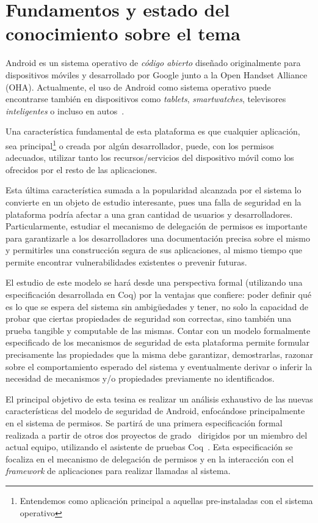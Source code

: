 \section{Fundamentos y estado del conocimiento sobre el tema}

Android es un sistema operativo de \textit{código abierto} diseñado
originalmente para dispositivos móviles y desarrollado por Google junto a la
Open Handset Alliance (OHA). Actualmente, el uso de Android como sistema
operativo puede encontrarse también en dispositivos como \textit{tablets},
\textit{smartwatches}, televisores \textit{inteligentes} o incluso en autos~\cite{android-car}.

Una característica fundamental de esta plataforma es que cualquier aplicación,
sea principal\footnote{Entendemos como aplicación principal a aquellas
    pre-instaladas con el sistema operativo} o creada por algún desarrollador,
puede, con los permisos adecuados, utilizar tanto los recursos/servicios del
dispositivo móvil como los ofrecidos por el resto de las aplicaciones.

Esta última característica sumada a la popularidad alcanzada por el sistema lo
convierte en un objeto de estudio interesante, pues una falla de seguridad en la
plataforma podría afectar a una gran cantidad de usuarios y desarrolladores.
Particularmente, estudiar el mecanismo de delegación de permisos es importante
para garantizarle a los desarrolladores una documentación precisa sobre el mismo
y permitirles una construcción segura de sus aplicaciones, al mismo tiempo que
permite encontrar vulnerabilidades existentes o prevenir futuras.

El estudio de este modelo se hará desde una perspectiva formal (utilizando una
especificación desarrollada en Coq) por la ventajas que confiere: poder definir
qué es lo que se espera del sistema sin ambigüedades y tener, no solo la
capacidad de probar que ciertas propiedades de seguridad son correctas, sino
también una prueba tangible y computable de las mismas. Contar con un modelo
formalmente especificado de los mecanismos de seguridad de esta plataforma
permite formular precisamente las propiedades que la misma debe garantizar,
demostrarlas, razonar sobre el comportamiento esperado del sistema y
eventualmente derivar o inferir la necesidad de mecanismos y/o propiedades
previamente no identificados.

El principal objetivo de esta tesina es realizar un análisis exhaustivo de las
nuevas características del modelo de seguridad de Android, enfocándose
principalmente en el sistema de permisos. Se partirá de una primera
especificación formal realizada a partir de otros dos proyectos de
grado~\cite{fgorostiaga, aromano} dirigidos por un miembro del actual equipo,
utilizando el asistente de pruebas Coq~\cite{coq}. Esta especificación se
focaliza en el mecanismo de delegación de permisos y en la interacción con el
\textit{framework} de aplicaciones para realizar llamadas al sistema.

